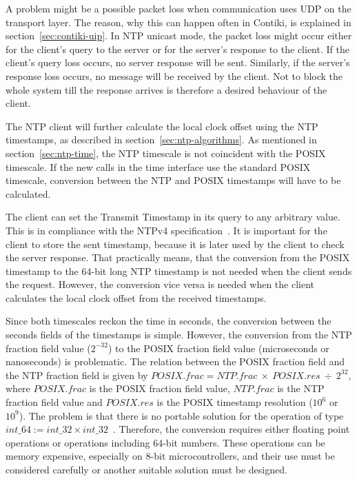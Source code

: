 A problem might be a possible packet loss when communication uses UDP on the transport layer.
The reason, why this can happen often in Contiki, is explained in section~\ref{sec:contiki-uip}.
In NTP unicast mode, the packet loss might occur either for the client's query to the server
or for the server's response to the client.
If the client's query loss occurs, no server response will be sent.
Similarly, if the server's response loss occurs, no message will be received by the client.
Not to block the whole system till the response arrives
is therefore a desired behaviour of the client.

The NTP client will further calculate the local clock offset using the NTP timestamps,
as described in section~\ref{sec:ntp-algorithms}.
As mentioned in section~\ref{sec:ntp-time}, the NTP timescale is not
coincident with the POSIX timescale.
If the new calls in the time interface use the standard POSIX timescale,
conversion between the NTP and POSIX timestamps will have to be calculated.

The client can set the Transmit Timestamp in its query to any arbitrary value.
This is in compliance with the NTPv4 specification~\cite{rfc5905}.
It is important for the client to store the sent timestamp,
because it is later used by the client to check the server response.
That practically means, that the conversion from the POSIX timestamp to the 64-bit long NTP timestamp
is not needed when the client sends the request.
However, the conversion vice versa is needed when the client calculates
the local clock offset from the received timestamps.

Since both timescales reckon the time in seconds, the conversion between
the seconds fields of the timestamps is simple.
However, the conversion from the NTP fraction field value ($2^{-32}$)
to the POSIX fraction field value (microseconds or nanoseconds) is problematic.
The relation between the POSIX fraction field and the NTP fraction field
is given by $POSIX.frac = NTP.frac~\times~POSIX.res~\div~2^{32}$,
where $POSIX.frac$ is the POSIX fraction field value,
$NTP.frac$ is the NTP fraction field value and
$POSIX.res$ is the POSIX timestamp resolution ($10^6$ or $10^9$).
The problem is that there is no portable solution for the operation of type $int\_64 := int\_32 \times int\_32$~\cite{c99}.
Therefore, the conversion requires either floating point operations or operations including 64-bit numbers.
These operations can be memory expensive, especially on 8-bit microcontrollers,
and their use must be considered carefully or another suitable solution must be designed.
